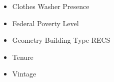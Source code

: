 \begin{itemize}
\item Clothes Washer Presence
\item Federal Poverty Level
\item Geometry Building Type RECS
\item Tenure
\item Vintage
\end{itemize}
